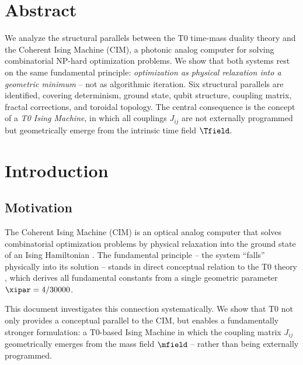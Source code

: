 
\section*{Abstract}

We analyze the structural parallels between the T0 time-mass duality theory and the
Coherent Ising Machine (CIM), a photonic analog computer for solving combinatorial
NP-hard optimization problems. We show that both systems rest on the same fundamental
principle: \emph{optimization as physical relaxation into a geometric minimum} -- not
as algorithmic iteration. Six structural parallels are identified, covering determinism,
ground state, qubit structure, coupling matrix, fractal corrections, and toroidal
topology. The central consequence is the concept of a \emph{T0 Ising Machine}, in which
all couplings $J_{ij}$ are not externally programmed but geometrically emerge from the
intrinsic time field $\Tfield$.

\clearpage

\section{Introduction}
\label{sec:intro}

\subsection{Motivation}

The Coherent Ising Machine (CIM) is an optical analog computer that solves combinatorial
optimization problems by physical relaxation into the ground state of an Ising Hamiltonian
\cite{inagaki_cim_2016, mcmahon_cim_2016}. The fundamental principle -- the system
``falls'' physically into its solution -- stands in direct conceptual relation to the
T0 theory \cite{pascher_t0_2025}, which derives all fundamental constants from a single
geometric parameter $\xipar = 4/30000$.

This document investigates this connection systematically. We show that T0 not only
provides a conceptual parallel to the CIM, but enables a fundamentally stronger
formulation: a T0-based Ising Machine in which the coupling matrix $J_{ij}$ geometrically
emerges from the mass field $\mfield$ -- rather than being externally programmed.

